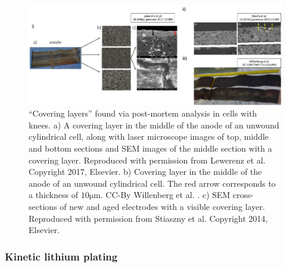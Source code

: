 \documentclass[journal=jpcl, manuscript=article, layout=onecolumn]{achemso}
\begin{document}
\begin{figure}[ht]
\centering
\includegraphics[scale = 0.5]{figures/CoveringLayers.pdf}
\caption{``Covering layers'' found via post-mortem analysis in cells with knees. a) A covering layer in the middle of the anode of an unwound cylindrical cell, along with laser microscope images of top, middle and bottom sections and SEM images of the middle section with a covering layer. Reproduced with permission from Lewerenz et al. \cite{lewerenz_post-mortem_2017} Copyright 2017, Elsevier. b) Covering layer in the middle of the anode of an unwound cylindrical cell. The red arrow corresponds to a thickness of $10 \mathrm{\mu m}$. CC-By Willenberg et al. \cite{willenberg_development_2020}. c) SEM cross-sections of new and aged electrodes with a visible covering layer. Reproduced with permission from Stiaszny et al. \cite{stiaszny_electrochemical_2014} Copyright 2014, Elsevier.}
\label{fig:covering_layers}
\end{figure}

\subsubsection{Kinetic lithium plating}
\end{document}

